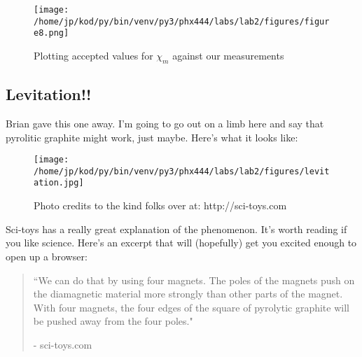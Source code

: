 \documentclass{article}
\begin{document}
\begin{figure}[H]
        \begin{center}
        \texttt{[image: /home/jp/kod/py/bin/venv/py3/phx444/labs/lab2/figures/figure8.png]}
        \caption{Plotting accepted values for $\chi_m$ against our measurements}
        \label{fig:fig_5}
        \end{center}
\end{figure}

\subsection{Levitation!!}
Brian gave this one away. I'm going to go out on a limb here and say that
pyrolitic graphite might work, just maybe. Here's what it looks like:


\begin{figure}[H]
        \begin{center}
        \texttt{[image: /home/jp/kod/py/bin/venv/py3/phx444/labs/lab2/figures/levitation.jpg]}
        \caption{Photo credits to the kind folks over at: http://sci-toys.com}
        \label{fig:fig_6}
        \end{center}
\end{figure}

Sci-toys has a really great explanation of the phenomenon. It's worth reading
if you like science. Here's an excerpt that will (hopefully) get you excited
enough to open up a browser:
\begin{quotation}

 ``We can do that by using four magnets. The poles of the magnets push on the
 diamagnetic material more strongly than other parts of the magnet. With four
 magnets, the four edges of the square of pyrolytic graphite will be pushed
 away from the four poles."

 - sci-toys.com

\end{quotation}
\end{document}

